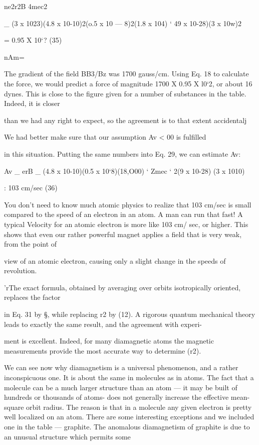 {{ne2r2B
4mec2

_ (3 x 1023)(4.8 x 10-10)2(o.5 x 10 --- 8)2(1.8 x 104)
‘ 49 x 10-28)(3 x 10w)2

= 0.95 X 10‘? (35)

nAm=

The gradient of the field BB3/Bz was 1700 gauss/cm. Using Eq. 18
to calculate the force, we would predict a force of magnitude
1700 X 0.95 X l0‘2, or about 16 dynes. This is close to the figure
given for a number of substances in the table. Indeed, it is closer

than we had any right to expect, so the agreement is to that extent
accidentalj

We had better make sure that our assumption Av < 00 is fulfilled

in this situation. Putting the same numbers into Eq. 29, we can
estimate Av:

Av _ erB _ (4.8 x 10-10)(0.5 x 10‘8)(18,O00)
‘ Zmec ‘ 2(9 x 10-28) (3 x 1010)

: 103 cm/sec (36)

You don't need to know much atomic physics to realize that
103 cm/sec is small compared to the speed of an electron in an atom.
A man can run that fast! A typical Velocity for an atomic electron
is more like 103 cm/ sec, or higher. This shows that even our rather
powerful magnet applies a field that is very weak, from the point of

view of an atomic electron, causing only a slight change in the speeds
of revolution.

'rThe exact formula, obtained by averaging over orbits isotropically oriented, replaces
the factor } in Eq. 31 by §, while replacing r2 by (12). A rigorous quantum
mechanical theory leads to exactly the same result, and the agreement with experi-

ment is excellent. Indeed, for many diamagnetic atoms the magnetic measurements
provide the most accurate way to determine (r2).

We can see now why diamagnetism is a universal phenomenon,
and a rather inconspicuous one. It is about the same in molecules
as in atoms. The fact that a molecule can be a much larger structure
than an atom --- it may be built of hundreds or thousands of atoms-
does not generally increase the effective mean-square orbit radius.
The reason is that in a molecule any given electron is pretty well
localized on an atom. There are some interesting exceptions and
we included one in the table --- graphite. The anomalous 
diamagnetism of graphite is due to an unusual structure which permits some

}

